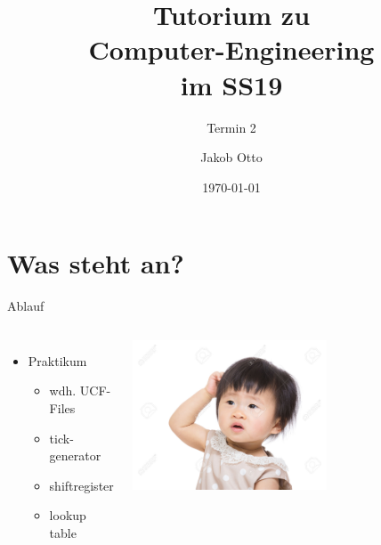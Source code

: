 \documentclass[aspectratio=169,presentation]{beamer}
\date{\today}
\newcommand{\terminNummer}{2}
\begin{document}
	\title[DT Tutorium]{Tutorium zu\\Computer-Engineering\\im SS19}
	\subtitle{Termin \terminNummer}
	\author[Otto]{Jakob Otto}
	\subject{CE Tutorium}
	
	\begin{frame}
		\titlepage
	\end{frame}

\section{Was steht an?}
\begin{frame}{Ablauf}
	\begin{columns}
		\column{0.6\textwidth}
		\begin{itemize}
			\item Praktikum
			\begin{itemize}
				\item wdh. UCF-Files
				\item tick-generator
				\item shiftregister
				\item lookup table
			\end{itemize}
		\end{itemize}
		\column{0.4\textwidth}
		\includegraphics[width=0.6\textwidth]{kratzen}
	\end{columns}
\end{frame}

%
%
%
\end{document}
